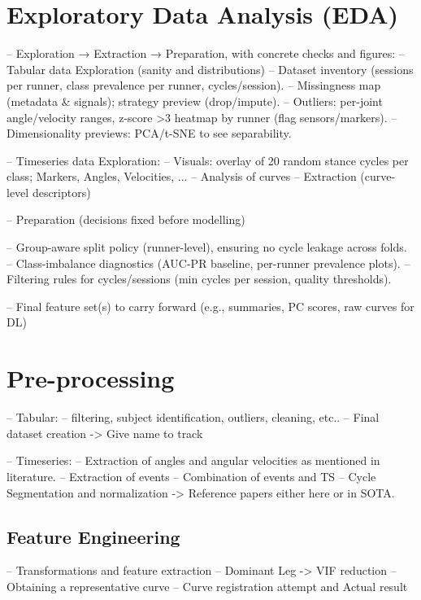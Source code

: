 

\section{Exploratory Data Analysis (EDA)}\label{sec:method-eda}
-- Exploration → Extraction → Preparation, with concrete checks and figures:
-- Tabular data Exploration (sanity and distributions)
-- Dataset inventory (sessions per runner, class prevalence per runner, cycles/session).
-- Missingness map (metadata \& signals); strategy preview (drop/impute).
-- Outliers: per-joint angle/velocity ranges, z-score >3 heatmap by runner (flag sensors/markers).
-- Dimensionality previews: PCA/t-SNE to see separability.


-- Timeseries data Exploration:
-- Visuals: overlay of 20 random stance cycles per class; Markers, Angles, Velocities, ...
-- Analysis of curves
-- Extraction (curve-level descriptors)


-- Preparation (decisions fixed before modelling)

-- Group-aware split policy (runner-level), ensuring no cycle leakage across folds.
-- Class-imbalance diagnostics (AUC-PR baseline, per-runner prevalence plots).
-- Filtering rules for cycles/sessions (min cycles per session, quality thresholds).

-- Final feature set(s) to carry forward (e.g., summaries, PC scores, raw curves for DL)



\section{Pre-processing}\label{sec:method-preprocessing}
-- Tabular:
    -- filtering, subject identification, outliers, cleaning, etc..
    -- Final dataset creation -> Give name to track

-- Timeseries:
    -- Extraction of angles and angular velocities as mentioned in literature.
    -- Extraction of events
    -- Combination of events and TS
    -- Cycle Segmentation and normalization -> Reference papers either here or in SOTA.

\subsection{Feature Engineering}\label{subsec:method-feature-engineering}
-- Transformations and feature extraction
    -- Dominant Leg -> VIF reduction
    -- Obtaining a representative curve
        -- Curve registration attempt and Actual result

